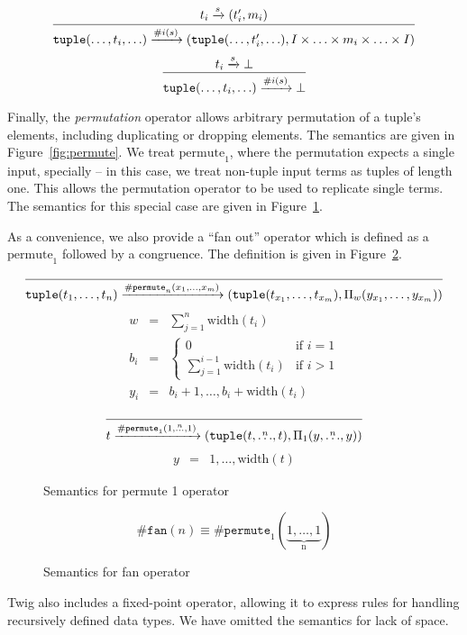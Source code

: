 \begin{figure*}[htb]
\[
\infer
  {\mathtt{tuple}(\ldots,t_i,\ldots) \arr{\#i(s)} (\mathtt{tuple}(\ldots,t_i',\ldots), I \times \ldots \times m_i \times \ldots \times I)}
  {t_i \arr{s} (t_i',m_i)}
\]
\[
\infer
  {\mathtt{tuple}(\ldots,t_i,\ldots) \arr{\#i(s)} \bot}
  {t_i \arr{s} \bot}
\]
\caption{Semantics for path operator}
\label{fig:path}
\end{figure*}

Finally, the \emph{permutation} operator allows arbitrary
permutation of a tuple's elements, including duplicating or
dropping elements. The semantics are given in
Figure~\ref{fig:permute}. We treat $\mbox{permute}_1$, where the
permutation expects a single input, specially -- in this case, we
treat non-tuple input terms as tuples of length one. This allows
the permutation operator to be used to replicate single terms. The
semantics for this special case are given in
Figure~\ref{fig:permute-one}.

As a convenience, we also provide a ``fan out'' operator which is
defined as a $\mbox{permute}_1$ followed by a congruence. The
definition is given in Figure~\ref{fig:fan}.

\begin{figure*}[htb]
\[
\infer
  {\mathtt{tuple}(t_1,\ldots,t_n) \arr{\mathtt{\#permute}_n(x_1,\ldots,x_m)} (\mathtt{tuple}(t_{x_1},\ldots,t_{x_m}),\Pi_w(y_{x_1},\ldots,y_{x_m}))}
  {}
\]
\begin{eqnarray*}
w   &=& \sum_{j=1}^n \mbox{width}(t_i)\\
b_i &=& \left\{
  \begin{array}{cl}
    0 & \mbox{if } i = 1\\
    \sum_{j=1}^{i-1} \mbox{width}(t_i) & \mbox{if } i > 1
  \end{array}
\right.\\
y_i &=& b_i+1,\ldots,b_i + \mbox{width}(t_i)
\end{eqnarray*}
\caption{Semantics for permutation operator}
\label{fig:permute}
\end{figure*}


\begin{figure}[htb]
\[
\infer
  {t \arr{\mathtt{\#permute}_1(1,\overset{n}{\ldots},1)} (\mathtt{tuple}(t,\overset{n}{\ldots},t),\Pi_1(y,\overset{n}{\ldots},y))}
  {}
\]
\begin{eqnarray*}
y &=& 1,\ldots,\mbox{width}(t)
\end{eqnarray*}
\caption{Semantics for permute 1 operator}
\label{fig:permute-one}
\end{figure}


\begin{figure}[ht]
\[
\mathtt{\#fan}(n) \equiv \mathtt{\#permute}_1(\underbrace{1,\ldots,1}_\text{n})
\]
\caption{Semantics for fan operator}
\label{fig:fan}
\end{figure}

Twig also includes a fixed-point operator, allowing it to express rules for handling recursively defined data types. We have omitted the semantics for lack of space.
